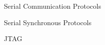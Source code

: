 \begin{section}{Serial Communication Protocols}
\begin{subsection}{Serial Synchronous Protocols}
\begin{subsubsection}{JTAG}
    \end{subsubsection}

  \end{subsection}

\end{section}
